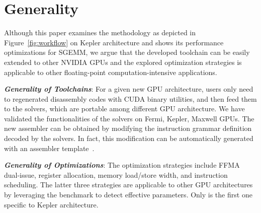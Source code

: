 \section{Generality}
\label{sec:generality}

Although this paper examines the methodology as depicted in Figure~\ref{fig:workflow} on Kepler architecture and shows its performance optimizations for SGEMM, we argue that the developed toolchain can be easily extended to other NVIDIA GPUs and the explored optimization strategies is applicable to other floating-point computation-intensive applications.

{\em {\bf Generality of Toolchains}}: For a given new GPU architecture, users only need to regenerated disassembly codes with CUDA binary utilities, and then feed them to the solvers, which are portable among different GPU architecture. We have validated the functionalities of the solvers on Fermi, Kepler, Maxwell GPUs. The new assembler can be obtained by modifying the instruction grammar definition decoded by the solvers. In fact, this modification can be automatically generated with an assembler template~\cite{baldassin2005extending}.

{\em {\bf Generality of Optimizations}}: The optimization strategies include
FFMA dual-issue, register allocation, memory load/store width, and instruction
scheduling. The latter three strategies are applicable to other GPU
architectures by leveraging the benchmark to detect effective parameters. Only is
the first one specific to Kepler architecture. 

